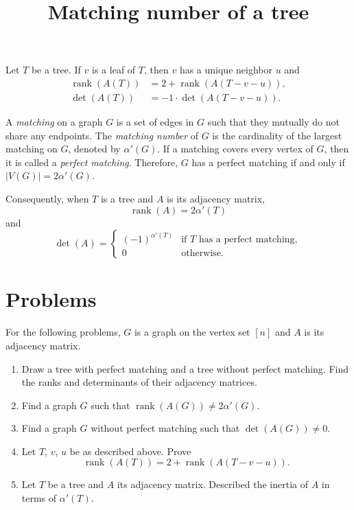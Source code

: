 \documentclass{article}
\title{Matching number of a tree}
\date{\vspace{-1cm}}
\newcommand{\rank}{\operatorname{rank}}
\theoremstyle{definition}
\begin{document}
\maketitle
\large

Let $T$ be a tree.  If $v$ is a leaf of $T$, then $v$ has a unique neighbor $u$ and 
\[\begin{aligned}
\rank(A(T)) &= 2 + \rank(A(T - v - u)), \\
\det(A(T)) &= -1\cdot\det(A(T - v - u)).
\end{aligned}\]

A \emph{matching} on a graph $G$ is a set of edges in $G$ such that they mutually do not share any endpoints.  The \emph{matching number} of $G$ is the cardinality of the largest matching on $G$, denoted by $\alpha'(G)$.  If a matching covers every vertex of $G$, then it is called a \emph{perfect matching}.  Therefore, $G$ has a perfect matching if and only if $|V(G)| = 2\alpha'(G)$.

Consequently, when $T$ is a tree and $A$ is its adjacency matrix, 
\[\rank(A) = 2\alpha'(T)\]
and
\[\det(A) = \begin{cases}
(-1)^{\alpha'(T)} & \text{if $T$ has a perfect matching}, \\
0 & \text{otherwise}.
\end{cases}\]

\section*{Problems}
For the following problems, $G$ is a graph on the vertex set $[n]$ and $A$ is its adjacency matrix.
\begin{enumerate}
\setlength\itemsep{2em}
\item Draw a tree with perfect matching and a tree without perfect matching.  Find the ranks and determinants of their adjacency matrices.
\item Find a graph $G$ such that $\rank(A(G)) \neq 2\alpha'(G)$.
\item Find a graph $G$ without perfect matching such that $\det(A(G)) \neq 0$.
\item Let $T$, $v$, $u$ be as described above.  Prove 
\[\rank(A(T)) = 2 + \rank(A(T - v - u)).\]
\item Let $T$ be a tree and $A$ its adjacency matrix.  Described the inertia of $A$ in terms of $\alpha'(T)$.
\end{enumerate}

\end{document}
